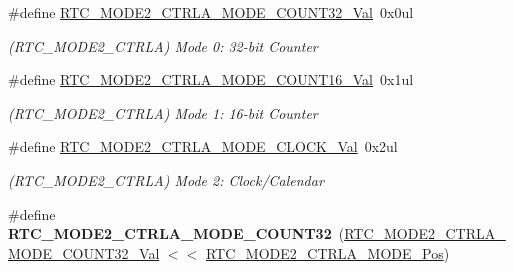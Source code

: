 \begin{DoxyCompactItemize}
\item 
\hypertarget{group___s_a_m_l21___r_t_c_ga6bfebd62053869a6d1e5b0fcdb40df85}{}\#define \hyperlink{group___s_a_m_l21___r_t_c_ga6bfebd62053869a6d1e5b0fcdb40df85}{R\+T\+C\+\_\+\+M\+O\+D\+E2\+\_\+\+C\+T\+R\+L\+A\+\_\+\+M\+O\+D\+E\+\_\+\+C\+O\+U\+N\+T32\+\_\+\+Val}~0x0ul\label{group___s_a_m_l21___r_t_c_ga6bfebd62053869a6d1e5b0fcdb40df85}

\begin{DoxyCompactList}\small\item\em (R\+T\+C\+\_\+\+M\+O\+D\+E2\+\_\+\+C\+T\+R\+L\+A) Mode 0\+: 32-\/bit Counter \end{DoxyCompactList}\item 
\hypertarget{group___s_a_m_l21___r_t_c_ga3d4a4512fa9a9209dffc315f2877e7e2}{}\#define \hyperlink{group___s_a_m_l21___r_t_c_ga3d4a4512fa9a9209dffc315f2877e7e2}{R\+T\+C\+\_\+\+M\+O\+D\+E2\+\_\+\+C\+T\+R\+L\+A\+\_\+\+M\+O\+D\+E\+\_\+\+C\+O\+U\+N\+T16\+\_\+\+Val}~0x1ul\label{group___s_a_m_l21___r_t_c_ga3d4a4512fa9a9209dffc315f2877e7e2}

\begin{DoxyCompactList}\small\item\em (R\+T\+C\+\_\+\+M\+O\+D\+E2\+\_\+\+C\+T\+R\+L\+A) Mode 1\+: 16-\/bit Counter \end{DoxyCompactList}\item 
\hypertarget{group___s_a_m_l21___r_t_c_ga5425303ad1df9e5f93d15c62dd45ca6b}{}\#define \hyperlink{group___s_a_m_l21___r_t_c_ga5425303ad1df9e5f93d15c62dd45ca6b}{R\+T\+C\+\_\+\+M\+O\+D\+E2\+\_\+\+C\+T\+R\+L\+A\+\_\+\+M\+O\+D\+E\+\_\+\+C\+L\+O\+C\+K\+\_\+\+Val}~0x2ul\label{group___s_a_m_l21___r_t_c_ga5425303ad1df9e5f93d15c62dd45ca6b}

\begin{DoxyCompactList}\small\item\em (R\+T\+C\+\_\+\+M\+O\+D\+E2\+\_\+\+C\+T\+R\+L\+A) Mode 2\+: Clock/\+Calendar \end{DoxyCompactList}\item 
\hypertarget{group___s_a_m_l21___r_t_c_gacc929b4bb71fc99422d920c1e384a0d1}{}\#define {\bfseries R\+T\+C\+\_\+\+M\+O\+D\+E2\+\_\+\+C\+T\+R\+L\+A\+\_\+\+M\+O\+D\+E\+\_\+\+C\+O\+U\+N\+T32}~(\hyperlink{group___s_a_m_l21___r_t_c_ga6bfebd62053869a6d1e5b0fcdb40df85}{R\+T\+C\+\_\+\+M\+O\+D\+E2\+\_\+\+C\+T\+R\+L\+A\+\_\+\+M\+O\+D\+E\+\_\+\+C\+O\+U\+N\+T32\+\_\+\+Val} $<$$<$ \hyperlink{group___s_a_m_l21___r_t_c_ga9e63063a02c833995e0bc78142f8122b}{R\+T\+C\+\_\+\+M\+O\+D\+E2\+\_\+\+C\+T\+R\+L\+A\+\_\+\+M\+O\+D\+E\+\_\+\+Pos})\label{group___s_a_m_l21___r_t_c_gacc929b4bb71fc99422d920c1e384a0d1}


\end{DoxyCompactItemize}
